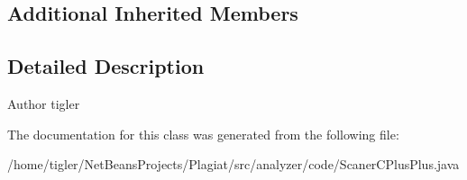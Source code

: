 \subsection*{Additional Inherited Members}


\subsection{Detailed Description}
\begin{DoxyAuthor}{Author}
tigler 
\end{DoxyAuthor}


The documentation for this class was generated from the following file\+:\begin{DoxyCompactItemize}
\item 
/home/tigler/\+Net\+Beans\+Projects/\+Plagiat/src/analyzer/code/Scaner\+C\+Plus\+Plus.\+java\end{DoxyCompactItemize}
